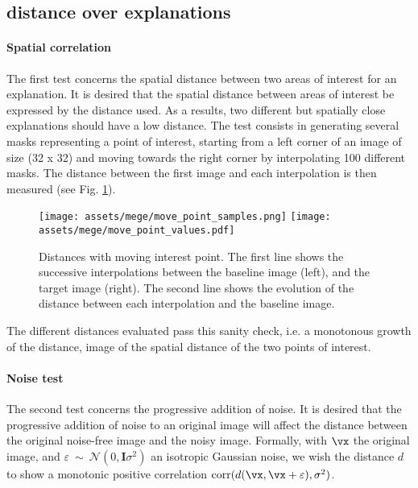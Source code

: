 
\subsection{distance over explanations}
\label{ap:mege:distances}

\paragraph{Spatial correlation}
The first test concerns the spatial distance between two areas of interest for an explanation. It is desired that the spatial distance between areas of interest be expressed by the distance used. As a results, two different but spatially close explanations should have a low distance. The test consists in generating several masks representing a point of interest, starting from a left corner of an image of size (32 x 32) and moving towards the right corner by interpolating 100 different masks. The distance between the first image and each interpolation is then measured (see Fig. \ref{dist:move}). 

\begin{figure}[h]
  \centering
  \texttt{[image: assets/mege/move\_point\_samples.png]}
  \texttt{[image: assets/mege/move\_point\_values.pdf]}
  \caption{
    Distances with moving interest point. The first line shows the successive interpolations between the baseline image (left), and the target image (right). The second line shows the evolution of the distance between each interpolation and the baseline image.
    }
  \label{dist:move}
\end{figure}

The different distances evaluated pass this sanity check, i.e. a monotonous growth of the distance, image of the spatial distance of the two points of interest. 

\paragraph{Noise test}

The second test concerns the progressive addition of noise. It is desired that the progressive addition of noise to an original image will affect the distance between the original noise-free image and the noisy image. Formally, with $\vx$ the original image, and $\varepsilon\ \sim\ \mathcal{N}(0, \bm{I}\sigma^2)$ an isotropic Gaussian noise, we wish the distance $d$ to show a monotonic positive correlation $\operatorname{corr}( d(\vx, \vx + \varepsilon), \sigma^2 )$.

